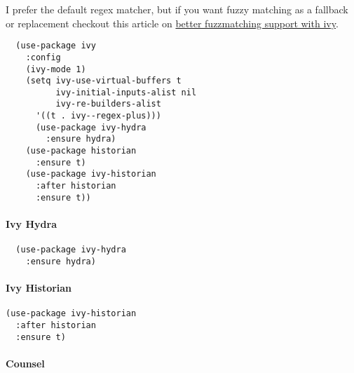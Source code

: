 \documentclass[11pt]{article}
\begin{document}
I prefer the default regex matcher, but if you want fuzzy matching as
a fallback or replacement checkout this article on \href{https://oremacs.com/2016/01/06/ivy-flx/}{better fuzzmatching
support with ivy}.

\begin{verbatim}
  (use-package ivy
    :config
    (ivy-mode 1)
    (setq ivy-use-virtual-buffers t
          ivy-initial-inputs-alist nil
          ivy-re-builders-alist
	  '((t . ivy--regex-plus)))
      (use-package ivy-hydra
        :ensure hydra)
    (use-package historian
      :ensure t)
    (use-package ivy-historian
      :after historian 
      :ensure t))
\end{verbatim}

\paragraph*{Ivy Hydra}
\label{sec:orgcae516e}

\begin{verbatim}
  (use-package ivy-hydra
    :ensure hydra)
\end{verbatim}

\paragraph*{Ivy Historian}
\label{sec:org77ed887}

\begin{verbatim}
(use-package ivy-historian
  :after historian 
  :ensure t)
\end{verbatim}

\paragraph*{Counsel}
\label{sec:orgdcfacdd}
\end{document}
